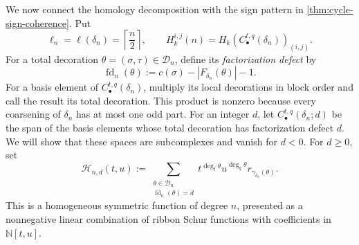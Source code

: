 \documentclass{amsart}
\theoremstyle{definition}
\theoremstyle{remark}
\begin{document}
We now connect the homology decomposition with the sign pattern in
\cref{thm:cycle-sign-coherence}.  Put
\[
 \ell_n=\ell(\delta_n)=\left\lceil\frac n2\right\rceil,
 \qquad
 H_k^{i,j}(n)=H_k(C_\bullet^{t,q}(\delta_n))_{(i,j)}.
\]
For a total decoration $\theta=(\sigma,\tau)\in\mathcal D_n$, define its
\emph{factorization defect} by
\begin{equation}
 \operatorname{fd}_n(\theta)
 :=c(\sigma)-|F_{\delta_n}(\theta)|-1.
 \label{eq:factorization-defect}
\end{equation}
For a basis element of $C_\bullet^{t,q}(\delta_n)$, multiply its local
decorations in block order and call the result its total decoration.  This
product is nonzero because every coarsening of $\delta_n$ has at most one odd
part.  For an
integer $d$, let $C_\bullet^{t,q}(\delta_n;d)$ be the span of the basis
elements whose total decoration has factorization defect $d$.  We will show
that these spaces are subcomplexes and vanish for $d<0$.  For $d\geq0$, set
\begin{equation}
 \mathcal H_{n,d}(t,u)
 :=\sum_{\substack{\theta\in\mathcal D_n\\
                    \operatorname{fd}_n(\theta)=d}}
 t^{\deg_t\theta}u^{\deg_q\theta}
 r_{\gamma_{\delta_n}(\theta)}.
 \label{eq:defect-layer}
\end{equation}
This is a homogeneous symmetric function of degree $n$, presented as a
nonnegative linear combination of ribbon Schur functions with coefficients in
$\mathbb N[t,u]$.
\end{document}
